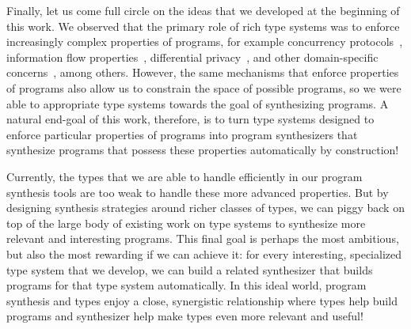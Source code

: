 Finally, let us come full circle on the ideas that we developed at the beginning of this work.
We observed that the primary role of rich type systems was to enforce increasingly complex properties of programs, for example concurrency protocols~\citep{mazurak-icfp-2010}, information flow properties~\citep{jia-icfp-2008}, differential privacy~\citep{gaboardi-popl-2013}, and other domain-specific concerns~\citep{hudak-handbook-pl-1998}, among others.
However, the same mechanisms that enforce properties of programs also allow us to constrain the space of possible programs, so we were able to appropriate type systems towards the goal of synthesizing programs.
A natural end-goal of this work, therefore, is to turn type systems designed to enforce particular properties of programs into program synthesizers that synthesize programs that possess these properties automatically by construction!

Currently, the types that we are able to handle efficiently in our program synthesis tools are too weak to handle these more advanced properties.
But by designing synthesis strategies around richer classes of types, we can piggy back on top of the large body of existing work on type systems to synthesize more relevant and interesting programs.
This final goal is perhaps the most ambitious, but also the most rewarding if we can achieve it: for every interesting, specialized type system that we develop, we can build a related synthesizer that builds programs for that type system automatically.
In this ideal world, program synthesis and types enjoy a close, synergistic relationship where types help build programs and synthesizer help make types even more relevant and useful!
